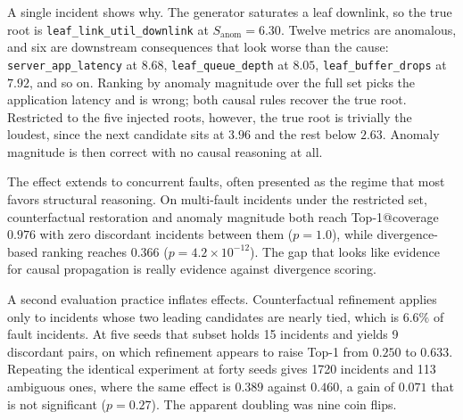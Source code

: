 \documentclass[conference]{IEEEtran}
\begin{document}
\begin{table}[htbp]
\centering
\caption{Top-1 accuracy on the restricted candidate set of five injected roots, 5 seeds, 215 incidents.}
\label{tab:candset}
\end{table}

A single incident shows why. The generator saturates a leaf downlink, so the true root is \texttt{leaf\_link\_util\_downlink} at $S_{\mathrm{anom}}=6.30$. Twelve metrics are anomalous, and six are downstream consequences that look worse than the cause: \texttt{server\_app\_latency} at $8.68$, \texttt{leaf\_queue\_depth} at $8.05$, \texttt{leaf\_buffer\_drops} at $7.92$, and so on. Ranking by anomaly magnitude over the full set picks the application latency and is wrong; both causal rules recover the true root. Restricted to the five injected roots, however, the true root is trivially the loudest, since the next candidate sits at $3.96$ and the rest below $2.63$. Anomaly magnitude is then correct with no causal reasoning at all.

The effect extends to concurrent faults, often presented as the regime that most favors structural reasoning. On multi-fault incidents under the restricted set, counterfactual restoration and anomaly magnitude both reach Top-1@coverage $0.976$ with zero discordant incidents between them ($p=1.0$), while divergence-based ranking reaches $0.366$ ($p=4.2\times10^{-12}$). The gap that looks like evidence for causal propagation is really evidence against divergence scoring.

\label{sec:results-power}
A second evaluation practice inflates effects. Counterfactual refinement applies only to incidents whose two leading candidates are nearly tied, which is $6.6\%$ of fault incidents. At five seeds that subset holds 15 incidents and yields 9 discordant pairs, on which refinement appears to raise Top-1 from $0.250$ to $0.633$. Repeating the identical experiment at forty seeds gives 1720 incidents and 113 ambiguous ones, where the same effect is $0.389$ against $0.460$, a gain of $0.071$ that is not significant ($p=0.27$). The apparent doubling was nine coin flips.
\end{document}
